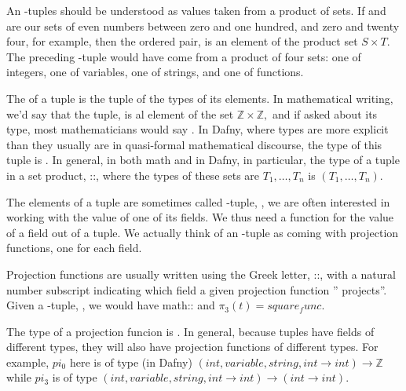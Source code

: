 \documentclass[letterpaper,10pt,english]{sphinxmanual}
\begin{document}
An -tuples should be understood as values taken from a product of
 sets.  If  and  are our sets of even numbers between zero
and one hundred, and zero and twenty four, for example, then the
ordered pair,  is an element of the product set \(S
\times T\).  The preceding -tuple would have come from a product of
four sets: one of integers, one of variables, one of strings, and one
of functions.

The  of a tuple is the tuple of the types of its elements. In
mathematical writing, we’d say that the tuple,  is al element
of the set \({\mathbb Z} \times {\mathbb Z},\) and if asked about
its type, most mathematicians would say . In Dafny,
where types are more explicit than they usually are in quasi-formal
mathematical discourse, the type of this tuple is . In
general, in both math and in Dafny, in particular, the type of a tuple
in a set product, ::, where
the types of these sets are \(T_1, \ldots, T_n\) is \((T_1,
\ldots, T_n)\).

The elements of a tuple are sometimes called -tuple, , we are often interested in working with the
value of one of its fields. We thus need a function for 
the value of a field out of a tuple. We actually think of an -tuple
as coming with  projection functions, one for each field.

Projection functions are usually written using the Greek letter,
::, with a natural number subscript indicating which field a
given projection function ” projects”. Given a -tuple, , we would have math:: and
\(\pi_3(t) = square_func.\)

The type of a projection funcion is . In general, because tuples have fields of different types, they
will also have projection functions of different types. For example,
\(pi_0\) here is of type (in Dafny) \((int, variable, string,
int \rightarrow int) \rightarrow {\mathbb Z}\) while \(pi_3\) is of
type \((int, variable, string, int \rightarrow int) \rightarrow
(int \rightarrow int).\)
\end{document}
